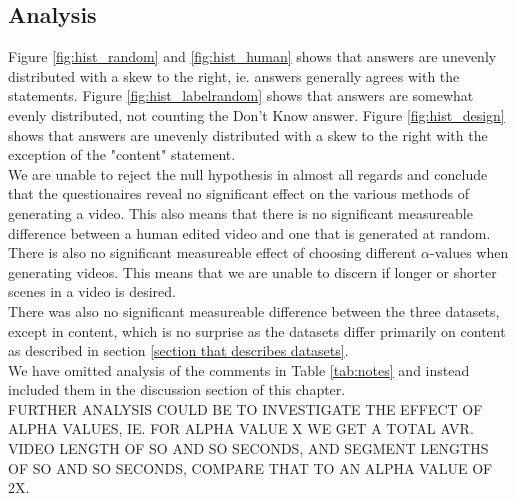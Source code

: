 \subsection{Analysis}
%
Figure \ref{fig:hist_random} and \ref{fig:hist_human} shows that answers are unevenly distributed with a skew to the right, ie. answers generally agrees with the statements. Figure \ref{fig:hist_labelrandom} shows that answers are somewhat evenly distributed, not counting the Don't Know answer. Figure \ref{fig:hist_design} shows that answers are unevenly distributed with a skew to the right with the exception of the "content" statement.\\
We are unable to reject the null hypothesis in almost all regards and conclude that the questionaires reveal no significant effect on the various methods of generating a video. This also means that there is no significant measureable difference between a human edited video and one that is generated at random.\\
%
There is also no significant measureable effect of choosing different $\alpha$-values when generating videos. This means that we are unable to discern if longer or shorter scenes in a video is desired.\\
%
There was also no significant measureable difference between the three datasets, except in content, which is no surprise as the datasets differ primarily on content as described in section \ref{section that describes datasets}.\\
%
We have omitted analysis of the comments in Table \ref{tab:notes} and instead included them in the discussion section of this chapter.\\
%
FURTHER ANALYSIS COULD BE TO INVESTIGATE THE EFFECT OF ALPHA VALUES, IE. FOR ALPHA VALUE X WE GET A TOTAL AVR. VIDEO LENGTH OF SO AND SO SECONDS, AND SEGMENT LENGTHS OF SO AND SO SECONDS, COMPARE THAT TO AN ALPHA VALUE OF 2X.\\
%
